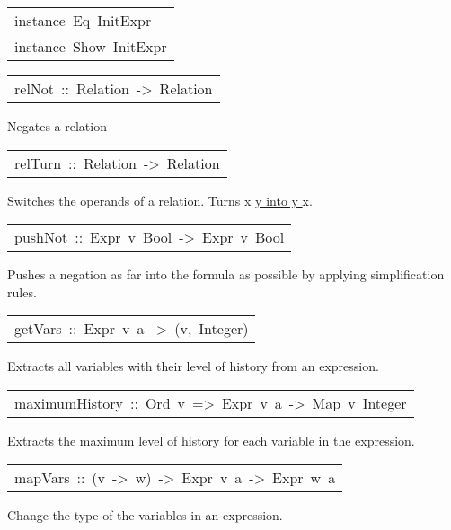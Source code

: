 \begin{haddockdesc}
\item[\begin{tabular}{@{}l}
instance\ Eq\ InitExpr\\instance\ Show\ InitExpr
\end{tabular}]
\end{haddockdesc}
\begin{haddockdesc}
\item[\begin{tabular}{@{}l}
relNot\ ::\ Relation\ ->\ Relation
\end{tabular}]\haddockbegindoc
Negates a relation
\par

\end{haddockdesc}
\begin{haddockdesc}
\item[\begin{tabular}{@{}l}
relTurn\ ::\ Relation\ ->\ Relation
\end{tabular}]\haddockbegindoc
Switches the operands of a relation.
   Turns x \url{ y into y } x.
\par

\end{haddockdesc}
\begin{haddockdesc}
\item[\begin{tabular}{@{}l}
pushNot\ ::\ Expr\ v\ Bool\ ->\ Expr\ v\ Bool
\end{tabular}]\haddockbegindoc
Pushes a negation as far into the formula as possible by applying simplification rules.
\par

\end{haddockdesc}
\begin{haddockdesc}
\item[\begin{tabular}{@{}l}
getVars\ ::\ Expr\ v\ a\ ->\ {\char 91}(v,\ Integer){\char 93}
\end{tabular}]\haddockbegindoc
Extracts all variables with their level of history from an expression.
\par

\end{haddockdesc}
\begin{haddockdesc}
\item[\begin{tabular}{@{}l}
maximumHistory\ ::\ Ord\ v\ =>\ Expr\ v\ a\ ->\ Map\ v\ Integer
\end{tabular}]\haddockbegindoc
Extracts the maximum level of history for each variable in the expression.
\par

\end{haddockdesc}
\begin{haddockdesc}
\item[\begin{tabular}{@{}l}
mapVars\ ::\ (v\ ->\ w)\ ->\ Expr\ v\ a\ ->\ Expr\ w\ a
\end{tabular}]\haddockbegindoc
Change the type of the variables in an expression.
\par

\end{haddockdesc}